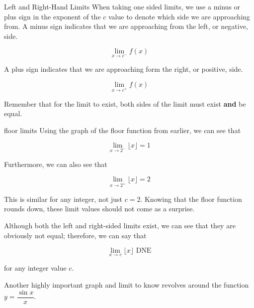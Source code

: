 \begin{notation}{Left and Right-Hand Limits}
    When taking one sided limits, we use a minus or plus sign in the exponent of the \( c \) value to denote which side we are approaching from.
    A minus sign indicates that we are approaching from the left, or negative, side.
    
    \[ \lim_{x \to c^-} f \left( x \right) \]
    
    A plus sign indicates that we are approaching form the right, or positive, side.
    
    \[ \lim_{x \to c^+} f \left( x \right) \]
    
    Remember that for the limit to exist, both sides of the limit must exist \textbf{and} be equal.
\end{notation}

\begin{example}{floor limits}
    Using the graph of the floor function from earlier, we can see that
    
    \[ \lim_{x \to 2^-} \lfloor x \rfloor = 1 \]
    
    Furthermore, we can also see that
    
    \[ \lim_{x \to 2^+} \lfloor x \rfloor = 2 \]
    
    This is similar for any integer, not just \( c = 2 \). Knowing that the floor function rounds down, these limit values should not come as a surprise.
    
    \vspace{0.3cm}
    
    Although both the left and right-sided limits exist, we can see that they are obviously not equal; therefore, we can say that
    
    \[ \lim_{x \to c} \lfloor x \rfloor \text{ DNE} \]
    
    for any integer value \( c \).
\end{example}

Another highly important graph and limit to know revolves around the function \( y = \dfrac{\sin{x}}{x} \).

\begin{center}
\end{center}

